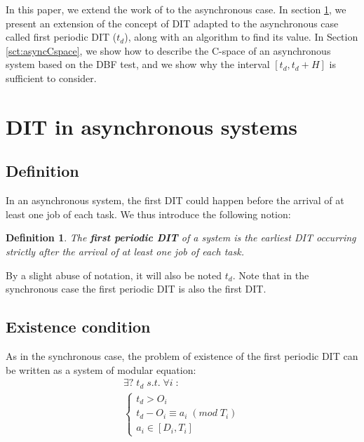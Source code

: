 \documentclass[times, 10pt,twocolumn, a4paper]{article}
\newtheorem{definition}{Definition}
\begin{document}
  In this paper, we extend the work of \cite{george2009characterization} to the asynchronous case. In section \ref{sct:asyncDIT}, we present an extension of the concept of DIT adapted to the asynchronous case called first periodic DIT ($t_d$), along with an algorithm to find its value. In Section \ref{sct:asyncCspace}, we show how to describe the C-space of an asynchronous system based on the DBF test, and we show why the interval $[t_d, t_d + H]$ is sufficient to consider.

\section{DIT in asynchronous systems}
  \label{sct:asyncDIT}

  \subsection{Definition}

  In an asynchronous system, the first DIT could happen before the arrival of at least one job of each task. We thus introduce the following notion:

  \begin{definition}
  The \textbf{first periodic DIT} of a system is the earliest DIT occurring strictly after the arrival of at least one job of each task.
  \end{definition}

  By a slight abuse of notation, it will also be noted $t_d$. Note that in the synchronous case the first periodic DIT is also the first DIT.

  \subsection{Existence condition}

  \label{sct:FPDITexist}

As in the synchronous case, the problem of existence of the first periodic DIT can be written as a system of modular equation:
$$
\begin{array}{l}
  \exists ? \; t_d \; s.t. \; \forall i \; :\\
  \left\{
    \begin{array}{l}
    t_d > O_i \\
    t_d - O_i \equiv a_i \; (mod \; T_i) \\
    a_i \in [D_i, T_i]
  \end{array}
\right.
\end{array}
$$
\end{document}
